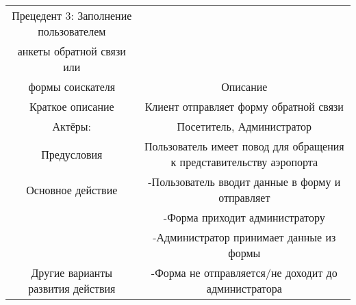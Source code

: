 \begin{table}[h]
    \begin{tabular}{|c|c|}
    \hline
    Прецедент 3: Заполнение пользователем\\ анкеты обратной связи или\\ формы соискателя         & Описание                                                                                              \\ \hline
    Краткое описание                  & Клиент отправляет форму обратной связи                                                            \\ \hline
    Актёры:                           & Посетитель, Администратор                                                                                            \\ \hline
    Предусловия                       & Пользователь имеет повод для обращения к представительству аэропорта                                   \\ \hline
    Основное действие                 & -Пользователь вводит данные в форму и отправляет\\ &-Форма приходит администратору\\ &-Администратор принимает данные из формы \\ \hline
    Другие варианты развития действия & -Форма не отправляется/не доходит до администратора                                      \\ \hline
    \end{tabular}
\end{table}


